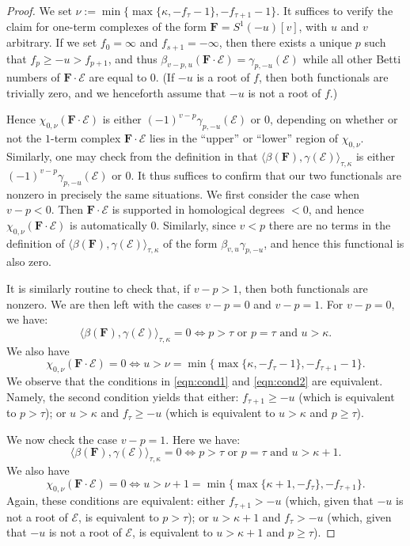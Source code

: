 \documentclass[12pt]{amsart}
\theoremstyle{definition}
\theoremstyle{remark}
\newcommand{\cE}{\mathcal{E}}
\newcommand{\FF}{\mathbf{F}}
\begin{document}
\begin{proof} 
We set $\nu:=\min\{\max\{\kappa, -f_{\tau}-1\},-f_{\tau+1}-1\}$.  It suffices to verify the claim for one-term complexes of the form $\FF=S^1(-u)[v]$, with $u$ and $v$ arbitrary.  
If we set $f_0=\infty$ and $f_{s+1}=-\infty$, then there exists a unique $p$ such that $f_p\geq -u>f_{p+1}$, and thus  $\beta_{v-p,u}(\FF\cdot \cE)=\gamma_{p,-u}(\cE)$ while all other Betti numbers  of $\FF\cdot \cE$ are equal to $0$.  (If $-u$ is a root of $f$, then both functionals are trivially zero, and we henceforth assume that $-u$ is not a root of $f$.)


Hence $\chi_{0, \nu}(\FF\cdot \cE)$ is either $(-1)^{v-p}\gamma_{p,-u}(\cE)$ or $0$, depending on whether or not the $1$-term complex $\FF\cdot \cE$ lies in the ``upper'' or ``lower'' region of $\chi_{0,\nu}$.  Similarly, one may check from the definition in \cite{eis-schrey-icm} that $\langle \beta(\FF),\gamma(\cE)\rangle_{\tau,\kappa}$ is either $(-1)^{v-p}\gamma_{p,-u}(\cE)$ or $0$.  
It thus suffices to confirm that our two functionals are nonzero in precisely the same situations.  We first consider the case when $v-p<0$.  Then $\FF\cdot \cE$ is supported in homological degrees $<0$, and hence $\chi_{0, \nu}(\FF\cdot \cE)$ is automatically $0$. Similarly, since $v<p$ there are no terms in the definition of $\langle \beta(\FF),\gamma(\cE)\rangle_{\tau,\kappa}$ of the form $\beta_{v,u}\gamma_{p,-u}$, and hence this functional is also zero.  

It is similarly routine to check that, if $v-p>1$, then both functionals are nonzero.  We are then left with the cases $v-p=0$ and $v-p=1$.  For $v-p=0$, we have:
\begin{equation}\label{eqn:cond1}
\langle \beta(\FF),\gamma(\cE)\rangle_{\tau,\kappa}=0 \iff p> \tau \text{ or } p=\tau \text{ and } u>\kappa.
\end{equation}
We also have
\begin{equation}\label{eqn:cond2}
\chi_{0,\nu}(\FF\cdot \cE)=0 \iff u> \nu=\min\{\max\{\kappa, -f_{\tau}-1\},-f_{\tau+1}-1\}.
\end{equation}
We observe that the conditions in \eqref{eqn:cond1} and \eqref{eqn:cond2} are equivalent.  Namely, the second condition yields that either: $f_{\tau+1}\geq-u$ (which is equivalent to $p>\tau$); or $u>\kappa$ and $f_{\tau}\geq -u$ (which is equivalent to $u>\kappa$ and $p\geq \tau$). 

We now check the case $v-p=1$.  Here we have:
\begin{equation}\label{eqn:cond3}
\langle \beta(\FF),\gamma(\cE)\rangle_{\tau,\kappa}=0 \iff p> \tau \text{ or } p=\tau \text{ and } u>\kappa+1.
\end{equation}
We also have
\begin{equation}\label{eqn:cond4}
\chi_{0,\nu}(\FF\cdot \cE)=0 \iff u> \nu+1=\min\{\max\{\kappa+1, -f_{\tau}\},-f_{\tau+1}\}.
\end{equation}
Again, these conditions are equivalent: either $f_{\tau+1}>-u$ (which, given that $-u$ is not a root of $\cE$, is equivalent to $p>\tau$); or $u>\kappa+1$ and $f_{\tau}>-u$ (which, given that $-u$ is not a root of $\cE$, is equivalent to $u>\kappa+1$ and $p\geq \tau$). 
\end{proof}
\end{document}
